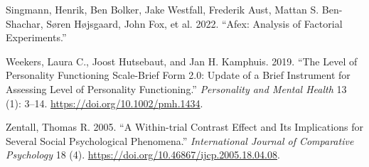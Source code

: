 \documentclass[
]{article}
\newlength{\cslhangindent}
\newenvironment{CSLReferences}[2] %
 {\begin{list}{}{%
  \setlength{\itemindent}{0pt}
  \setlength{\leftmargin}{0pt}
  \setlength{\parsep}{0pt}
  \ifodd #1
   \setlength{\leftmargin}{\cslhangindent}
   \setlength{\itemindent}{-1\cslhangindent}
  \fi
  \setlength{\itemsep}{#2\baselineskip}}}
 {\end{list}}
\begin{document}
\begin{CSLReferences}{1}{0}
Singmann, Henrik, Ben Bolker, Jake Westfall, Frederik Aust, Mattan S. Ben-Shachar, Søren Højsgaard, John Fox, et al. 2022. {``Afex: {Analysis} of {Factorial Experiments}.''}

Weekers, Laura C., Joost Hutsebaut, and Jan H. Kamphuis. 2019. {``The {Level} of {Personality Functioning Scale}-{Brief Form} 2.0: {Update} of a Brief Instrument for Assessing Level of Personality Functioning.''} \emph{Personality and Mental Health} 13 (1): 3--14. \url{https://doi.org/10.1002/pmh.1434}.

Zentall, Thomas R. 2005. {``A {Within-trial Contrast Effect} and Its {Implications} for {Several Social Psychological Phenomena}.''} \emph{International Journal of Comparative Psychology} 18 (4). \url{https://doi.org/10.46867/ijcp.2005.18.04.08}.

\end{CSLReferences}
\end{document}
